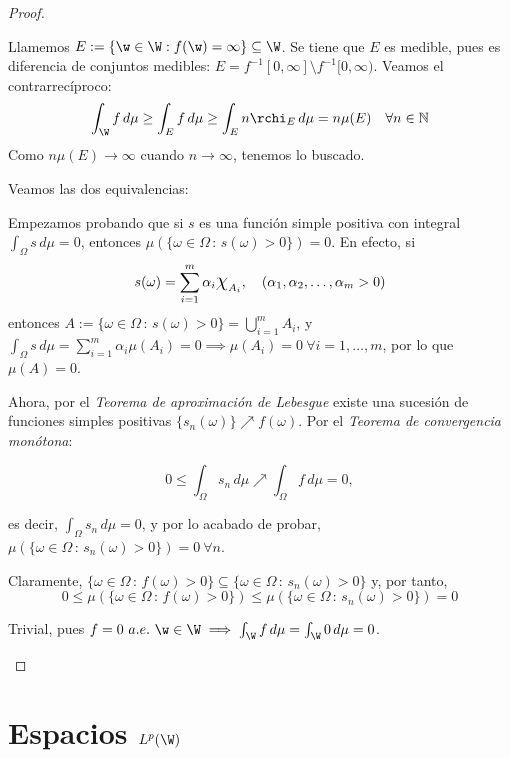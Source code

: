     \begin{proof} \hfill
    \begin{nlist}
    \item Llamemos $E := \{\w \in \W: f(\w) = \infty\} \subseteq \W$. Se tiene que $E$ es medible, pues es diferencia de conjuntos medibles: $E = f^{-1}[0,\infty] \setminus f^{-1}[0,\infty)$. Veamos el contrarrecíproco: $$\int_\W f\, d\mu \ge \int_E f\,d\mu \ge \int_E n\rchi_E\,d\mu = n\mu(E) \quad \forall n \in \mathbb{N}$$
    Como $n\mu(E) \to \infty$ cuando $n\to \infty$, tenemos lo buscado.
    \item Veamos las dos equivalencias:

    \boxed{\Rightarrow}  Empezamos probando que si $s$ es una función simple positiva con integral $\int_\Omega s \, d\mu = 0$, entonces $\mu(\{ \omega\in\Omega \, :\, s(\omega) >0\} ) = 0$. En efecto, si $$s(\omega)=\sum_{i=1}^m \alpha_i \text{\Large$\chi$}_{A_i}, \quad (\alpha_1,\alpha_2,\dots,\alpha_m > 0)$$ entonces $\displaystyle A:=\{ \omega\in\Omega \, :\, s(\omega) >0\} = \bigcup_{i=1}^m A_i$, y $\displaystyle \int_\Omega s \, d\mu = \sum_{i=1}^m \alpha_i \mu (A_i) = 0 \implies\mu(A_i)=0\ \forall i=1,\dots , m$, por lo que $\mu(A)=0 $.

Ahora, por el \textit{Teorema de aproximación de Lebesgue} existe una sucesión de funciones simples positivas $\{ s_n(\omega)\}\nearrow f(\omega)$. Por el \textit{Teorema de convergencia monótona}:

$$0\leq \int_\Omega s_n \, d\mu \nearrow \int_\Omega f\, d\mu = 0,$$

es decir, $\displaystyle \int_\Omega s_n \, d\mu=0$, y por lo acabado de probar, $\mu(\{ \omega\in\Omega \, :\, s_n(\omega) >0\} ) = 0 \ \forall n$.

Claramente, $\{ \omega\in\Omega \, :\,f(\omega) >0\}\subseteq \{ \omega\in\Omega \, :\, s_n(\omega) >0\}$ y, por tanto, $$0\leq \mu (\{ \omega\in\Omega \, :\,f(\omega) >0\} ) \leq \mu(\{ \omega\in\Omega \, :\, s_n(\omega) >0\} ) = 0$$

\boxed{\Leftarrow} Trivial, pues $f=0\ a.e.\ \w \in \W \implies \int_\W f\, d\mu = \int_\W 0\, d\mu = 0$.
\end{nlist}
\end{proof}

\newpage

\section{Espacios $L^p(\W)$}

